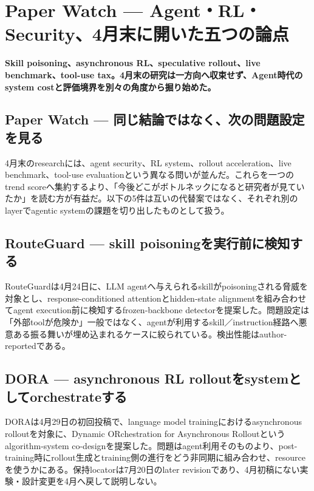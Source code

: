 \section{Paper Watch — Agent・RL・Security、4月末に開いた五つの論点}
\noindent\textbf{Skill poisoning、asynchronous RL、speculative rollout、live benchmark、tool-use tax。4月末の研究は一方向へ収束せず、Agent時代のsystem costと評価境界を別々の角度から掘り始めた。}\autocite{src-0d99a9f2485e,src-56e226358d6f,src-6bd60c76cba7,src-841d4b563b9d,src-8e578daed9ed}

\subsection{Paper Watch — 同じ結論ではなく、次の問題設定を見る}

4月末のresearchには、agent security、RL system、rollout acceleration、live benchmark、tool-use evaluationという異なる問いが並んだ。これらを一つのtrend scoreへ集約するより、「今後どこがボトルネックになると研究者が見ていたか」を読む方が有益だ。以下の5件は互いの代替案ではなく、それぞれ別のlayerでagentic systemの課題を切り出したものとして扱う。\autocite{src-0d99a9f2485e,src-56e226358d6f,src-6bd60c76cba7,src-841d4b563b9d,src-8e578daed9ed}


\subsection{RouteGuard — skill poisoningを実行前に検知する}

RouteGuardは4月24日に、LLM agentへ与えられるskillがpoisoningされる脅威を対象とし、response-conditioned attentionとhidden-state alignmentを組み合わせてagent execution前に検知するfrozen-backbone detectorを提案した。問題設定は「外部toolが危険か」一般ではなく、agentが利用するskill／instruction経路へ悪意ある振る舞いが埋め込まれるケースに絞られている。検出性能はauthor-reportedである。\autocite{src-0d99a9f2485e}


\subsection{DORA — asynchronous RL rolloutをsystemとしてorchestrateする}

DORAは4月29日の初回投稿で、language model trainingにおけるasynchronous rolloutを対象に、Dynamic ORchestration for Asynchronous Rolloutというalgorithm-system co-designを提案した。問題はagent利用そのものより、post-training時にrollout生成とtraining側の進行をどう非同期に組み合わせ、resourceを使うかにある。保持locatorは7月20日のlater revisionであり、4月初稿にない実験・設計変更を4月へ戻して説明しない。\autocite{src-6bd60c76cba7}


